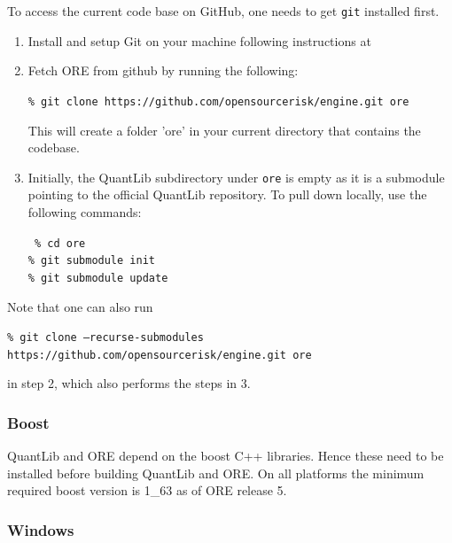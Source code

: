 \documentclass[12pt, a4paper]{article}
\begin{document}
To access the current code base on GitHub, one needs to get {\tt git} installed first.
   
\begin{enumerate}
\item Install and setup Git on your machine following instructions at \cite{git-download}

\item Fetch ORE from github by running the following: 

{\tt\% git clone https://github.com/opensourcerisk/engine.git ore}      

This will create a folder 'ore' in your current directory that contains the codebase.

\item Initially, the QuantLib subdirectory under {\tt ore} is empty as it is a submodule pointing to the official
  QuantLib repository. To pull down locally, use the following commands:

{\tt
\% cd ore \\
\% git submodule init \\
\% git submodule update
}

\end{enumerate}

Note that one can also run 

{\footnotesize \tt\% git clone --recurse-submodules https://github.com/opensourcerisk/engine.git ore}

in step 2, which also performs the steps in 3.

\subsubsection{Boost}\label{sec:boost}

QuantLib and ORE depend on the boost C++ libraries. Hence these need to be installed before building QuantLib and
ORE. On all platforms the minimum required boost version is 1\_63 as of ORE release 5.

\subsubsection*{Windows}
\end{document}

